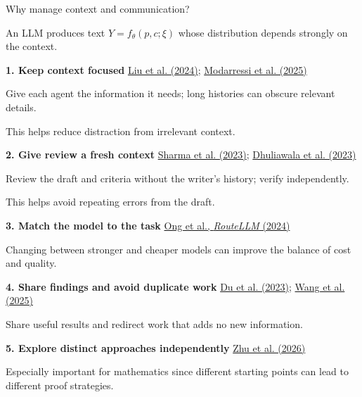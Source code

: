 \documentclass[11pt,aspectratio=169]{beamer}
\begin{document}
\begin{frame}[t]{Why manage context and communication?}
  \noindent\begin{minipage}{\textwidth}
  \raggedright\fontsize{9}{10.4}\selectfont
  An LLM produces text $Y=f_{\theta}(p,c;\xi)$ whose distribution
  depends strongly on the context.\par
  \vspace{1.5mm}
  {\bfseries 1. Keep context focused}\quad
  {\fontsize{7}{8}\selectfont
    \href{https://aclanthology.org/2024.tacl-1.9/}{\color{muted}Liu et al. (2024)};
    \href{https://arxiv.org/html/2502.05167v3}{\color{muted}Modarressi et al. (2025)}}\par
  {\fontsize{8.5}{10}\selectfont%
  Give each agent the information it needs; long histories can obscure relevant details.\par
  This helps reduce distraction from irrelevant context.\par}
  \vspace{1mm}

  {\bfseries 2. Give review a fresh context}\quad
  {\fontsize{7}{8}\selectfont
    \href{https://arxiv.org/html/2310.13548v4}{\color{muted}Sharma et al. (2023)};
    \href{https://arxiv.org/html/2309.11495v2}{\color{muted}Dhuliawala et al. (2023)}}\par
  {\fontsize{8.5}{10}\selectfont%
  Review the draft and criteria without the writer's history; verify independently.\par
  This helps avoid repeating errors from the draft.\par}
  \vspace{1mm}

  {\bfseries 3. Match the model to the task}\quad
  {\fontsize{7}{8}\selectfont
    \href{https://arxiv.org/abs/2406.18665}{\color{muted}Ong et al., \emph{RouteLLM} (2024)}}\par
  Changing between stronger and cheaper models can improve the balance of cost and quality.\par
  \vspace{1mm}

  {\bfseries 4. Share findings and avoid duplicate work}\quad
  {\fontsize{7}{8}\selectfont
    \href{https://arxiv.org/abs/2305.14325}{\color{muted}Du et al. (2023)};
    \href{https://aclanthology.org/2025.acl-long.1170/}{\color{muted}Wang et al. (2025)}}\par
  Share useful results and redirect work that adds no new information.\par
  \vspace{1mm}

  {\bfseries 5. Explore distinct approaches independently}\quad
  {\fontsize{7}{8}\selectfont
    \href{https://aclanthology.org/2026.findings-acl.1694/}{\color{muted}Zhu et al. (2026)}}\par
  Especially important for mathematics since different starting points can lead to
  different proof strategies.\par
  \end{minipage}
\end{frame}
\end{document}
